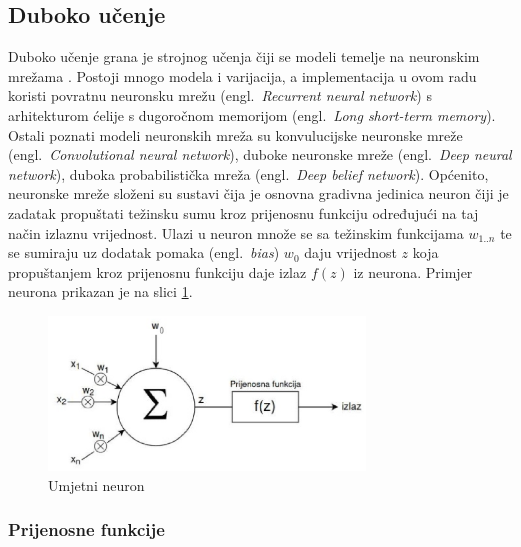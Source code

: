 \documentclass[times, utf8, zavrsni]{fer}
\begin{document}
\subsection{Duboko učenje}

Duboko učenje grana je strojnog učenja čiji se modeli temelje na neuronskim mrežama \citep{cupic}. Postoji mnogo modela i varijacija, a implementacija u ovom radu koristi povratnu neuronsku mrežu (engl.~\emph{Recurrent neural network}) s arhitekturom ćelije s dugoročnom memorijom (engl.~\emph{Long short-term memory}). Ostali poznati modeli neuronskih mreža su konvulucijske neuronske mreže (engl.~\emph{Convolutional neural network}), duboke neuronske mreže (engl.~\emph{Deep neural network}), duboka probabilistička mreža (engl.~\emph{Deep belief network}). Općenito, neuronske mreže složeni su sustavi čija je osnovna gradivna jedinica neuron čiji je zadatak propuštati težinsku sumu kroz prijenosnu funkciju određujući na taj način izlaznu vrijednost. Ulazi u neuron množe se sa težinskim funkcijama $w_{1..n}$ te se sumiraju uz dodatak pomaka (engl.~\emph{bias}) $w_0$ daju vrijednost $z$ koja propuštanjem kroz prijenosnu funkciju daje izlaz $f(z)$ iz neurona. Primjer neurona prikazan je na slici \ref{neuron}.  

\begin{figure}[h]
	\centering
	\includegraphics[width=0.75\textwidth]{neuron}
	\caption{Umjetni neuron}
	\label{neuron}
\end{figure}

\subsubsection{Prijenosne funkcije}
\end{document}
